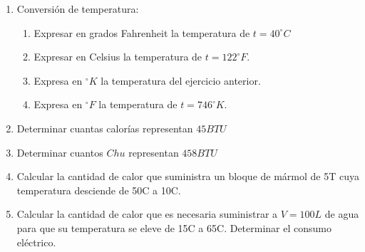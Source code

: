 \documentclass[../main]{subfiles}
\begin{document}
\begin{enumerate}
  \item Conversión de temperatura:
    \begin{enumerate}
      \item Expresar en grados Fahrenheit la temperatura de $t=40^\circ C$
      \item Expresar en Celsius la temperatura de $t=122^\circ F$.
      \item Expresa en $^\circ K$ la temperatura del ejercicio anterior.
      \item Expresa en $^\circ F$ la temperatura de $t=746^\circ K$.
    \end{enumerate}


  \item Determinar cuantas calorías representan $45 BTU$
  \item Determinar cuantos $Chu$ representan $458 BTU$

  \item Calcular la cantidad de calor que suministra un bloque de
    mármol de 5T cuya temperatura desciende de 50C a 10C.

  \item Calcular la cantidad de calor que es necesaria suministrar a
    $V=100L$ de agua para que su temperatura se eleve de 15C a 65C.
    Determinar el consumo eléctrico.

\end{enumerate}
\end{document}
